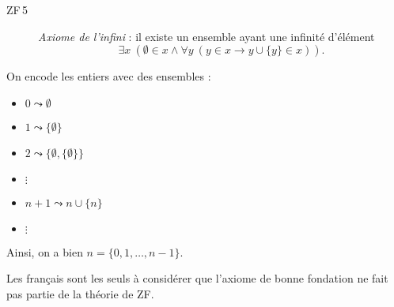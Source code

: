 \documentclass[./main]{subfiles}
\begin{document}
  \begin{description}
    \item[ZF\,5] \label{zf5}\textit{Axiome de l'infini} : il existe un ensemble ayant une infinité d'élément
      \[
      \exists x \: (\emptyset \in x \land \forall y \: (y \in x \to y \cup \{y\} \in x ))
      .\]
  \end{description}

  On encode les entiers avec des ensembles :
  \begin{itemize}
    \item $0 \leadsto \emptyset$
    \item $1 \leadsto \{\emptyset\} $
    \item $2 \leadsto \{\emptyset, \{\emptyset\}\}  $
    \item \quad \quad $\vdots$
    \item $n+1 \leadsto n \cup \{n\}$
    \item \quad \quad $\vdots$
  \end{itemize}

  Ainsi, on a bien $n  =\{0, 1, \ldots, n-1\}$.

  \begin{rmk}
    Les français sont les seuls à considérer que l'axiome de bonne fondation ne fait pas partie de la théorie de ZF.
  \end{rmk}
\end{document}
